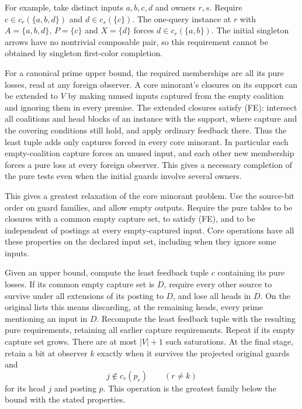 For example, take distinct inputs $a,b,c,d$ and owners
$r,s$. Require $c\in c_r(\{a,b,d\})$ and
$d\in c_s(\{c\})$. The one-query instance at $r$ with
$A=\{a,b,d\}$, $P=\{c\}$ and $X=\{d\}$ forces
$d\in c_r(\{a,b\})$. The initial singleton arrows have
no nontrivial composable pair, so this requirement
cannot be obtained by singleton first-color completion.

For a canonical prime upper bound, the required
memberships are all its pure losses, read at any foreign
observer. A core minorant's closures on its support
can be extended to $V$ by making unused inputs captured
from the empty coalition and ignoring them in every
premise. The extended closures satisfy (FE): intersect
all coalitions and head blocks of an instance with the
support, where capture and the covering conditions still
hold, and apply ordinary feedback there. Thus the least
tuple adds only captures forced in every core minorant.
In particular each empty-coalition capture forces an
unused input, and each other new membership forces a
pure loss at every foreign observer. This gives a
necessary completion of the pure tests even when the
initial guards involve several owners.

This gives a greatest relaxation of the core minorant
problem. Use the source-bit order on guard families, and
allow empty outputs. Require the pure tables to be
closures with a common empty capture set, to satisfy
(FE), and to be independent of postings at every
empty-captured input. Core operations have all these
properties on the declared input set, including when they
ignore some inputs.

Given an upper bound, compute the least feedback tuple
$c$ containing its pure losses. If its common empty
capture set is $D$, require every other source to survive
under all extensions of its posting to $D$, and lose
all heads in $D$. On the original lists this means
discarding, at the remaining heads, every prime
mentioning an input in $D$. Recompute the least feedback
tuple with the resulting pure requirements, retaining
all earlier capture requirements. Repeat if its empty
capture set grows. There are at most $|V|+1$ such
saturations. At the final stage, retain a bit at observer
$k$ exactly when it survives the projected original
guards and
\[
                  j\notin c_r(p_r)\qquad(r\ne k)
\]
for its head $j$ and posting $p$. This operation is the
greatest family below the bound with the stated
properties.

